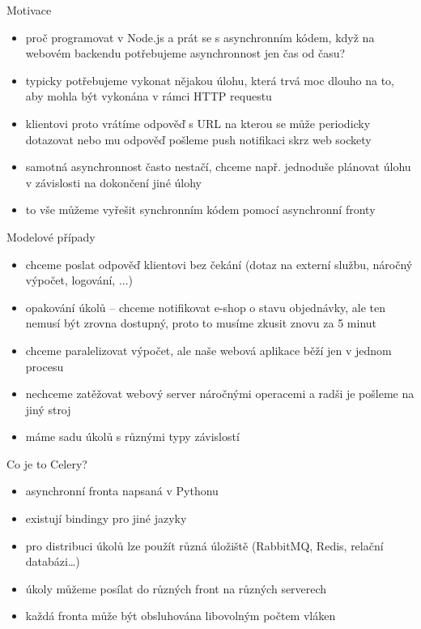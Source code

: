 \begin{slide}{Motivace}
\begin{itemize} 
    \item proč programovat v Node.js a prát se s asynchronním kódem, když na webovém backendu potřebujeme asynchronnost jen čas od času?
    \item typicky potřebujeme vykonat nějakou úlohu, která trvá moc dlouho na to, aby mohla být vykonána v rámci HTTP requestu
    \item klientovi proto vrátíme odpověď s URL na kterou se může periodicky dotazovat nebo mu odpověď pošleme push notifikaci skrz web sockety
    \item samotná asynchronnost často nestačí, chceme např. jednoduše plánovat úlohu v závislosti na dokončení jiné úlohy
    \item to vše můžeme vyřešit synchronním kódem  pomocí asynchronní fronty
\end{itemize}
\end{slide}

\begin{slide}{Modelové případy}
\begin{itemize}
    \item chceme poslat odpověď klientovi bez čekání (dotaz na externí službu, náročný výpočet, logování, ...)
    \item opakování úkolů -- chceme notifikovat e-shop o stavu objednávky, ale ten nemusí být zrovna dostupný, proto to musíme zkusit znovu za 5 minut
    \item chceme paralelizovat výpočet, ale naše webová aplikace běží jen v jednom procesu
    \item nechceme zatěžovat webový server náročnými operacemi a radši je pošleme na jiný stroj
    \item máme sadu úkolů s různými typy závislostí
\end{itemize}
\end{slide}

\begin{slide}{Co je to Celery?}
\begin{itemize}
    \item asynchronní fronta napsaná v Pythonu
    \item existují bindingy pro jiné jazyky
    \item pro distribuci úkolů lze použít různá úložiště (RabbitMQ, Redis, relační databázi\dots)
    \item úkoly můžeme posílat do různých front na různých serverech
    \item každá fronta může být obsluhována libovolným počtem vláken
\end{itemize}
\end{slide}


